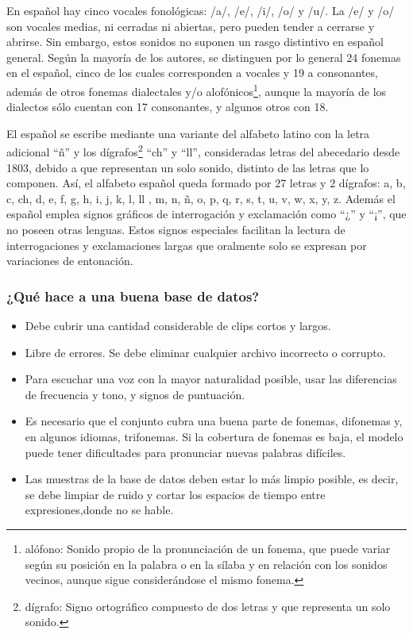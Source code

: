 En español hay cinco vocales fonológicas: /a/, /e/, /i/, /o/ y /u/. La /e/ y /o/ son vocales medias, ni cerradas ni abiertas, pero pueden tender a cerrarse y abrirse. Sin embargo, estos sonidos no suponen un rasgo distintivo en español general. Según la mayoría de los autores, se distinguen por lo general 24 fonemas en el español, cinco de los cuales corresponden a vocales y 19 a consonantes, además de otros fonemas dialectales y/o alofónicos\footnote{alófono: Sonido propio de la pronunciación de un fonema, que puede variar según su posición en la palabra o en la sílaba y en relación con los sonidos vecinos, aunque sigue considerándose el mismo fonema.}, aunque la mayoría de los dialectos sólo cuentan con 17 consonantes, y algunos otros con 18.

El español se escribe mediante una variante del alfabeto latino con la letra adicional ``ñ'' y los dígrafos\footnote{dígrafo: Signo ortográfico compuesto de dos letras y que representa un solo sonido.} ``ch'' y ``ll'', consideradas letras del abecedario desde 1803, debido a que representan un solo sonido, distinto de las letras que lo componen. Así, el alfabeto español queda formado por 27 letras y 2 dígrafos: a, b, c, ch, d, e, f, g, h, i, j, k, l, ll , m, n, ñ, o, p, q, r, s, t, u, v, w, x, y, z. Además el español emplea signos gráficos de interrogación y exclamación como ``¿'' y ``¡'', que no poseen otras lenguas. Estos signos especiales facilitan la lectura de interrogaciones y exclamaciones largas que oralmente solo se expresan por variaciones de entonación. 

\subsubsection{¿Qué hace a una buena base de datos?}

\begin{itemize}
	\item Debe cubrir una cantidad considerable de clips cortos y largos.
	\item Libre de errores. Se debe eliminar cualquier archivo incorrecto o corrupto. 
	\item Para escuchar una voz con la mayor naturalidad posible, usar las diferencias de frecuencia y tono, y signos de puntuación.
	\item Es necesario que el conjunto cubra una buena parte de fonemas, difonemas y, en algunos idiomas, trifonemas. Si la cobertura de fonemas es baja, el modelo puede tener dificultades para pronunciar nuevas palabras difíciles.
	\item Las muestras de la base de datos deben estar lo más limpio posible, es decir, se debe limpiar de ruido y cortar los espacios de tiempo entre expresiones,donde no se hable.
	
\end{itemize}

